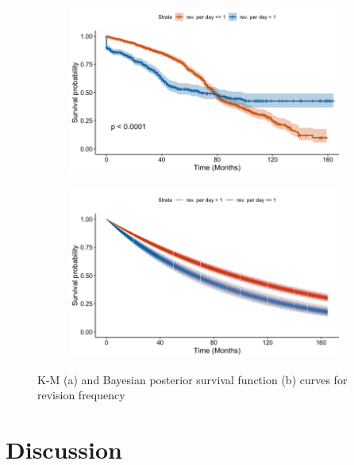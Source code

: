 \documentclass[sigconf,review]{acmart}
\begin{document}
\begin{figure}
    \centering
    \begin{subfigure}[b]{\columnwidth}
        \centering
        \includegraphics[width=\columnwidth, keepaspectratio=true]{img/KM-rev_freq.jpg}  
        \caption{}
        \label{fig:K-M_curve_for_revision_frequency}
    \end{subfigure}
    \hfill
    \begin{subfigure}[b]{\columnwidth}
        \centering 
        \includegraphics[width=\columnwidth, keepaspectratio=true]{img/commit_freq_bayes.png}
        \caption{}
        \label{fig:Bayesian_curve_for_revision_frequency}
    \end{subfigure}
    \caption{\small K-M (a) and Bayesian posterior survival function (b) curves for revision frequency} 
    \label{fig:Revision frequency}
\end{figure}

\section{Discussion} \label{discussion}
\end{document}
